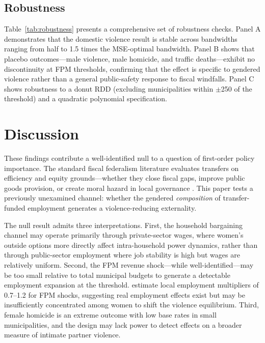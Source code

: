 \documentclass[12pt]{article}
\begin{document}
\subsection{Robustness}



Table~\ref{tab:robustness} presents a comprehensive set of robustness checks. Panel A demonstrates that the domestic violence result is stable across bandwidths ranging from half to 1.5 times the MSE-optimal bandwidth. Panel B shows that placebo outcomes---male violence, male homicide, and traffic deaths---exhibit no discontinuity at FPM thresholds, confirming that the effect is specific to gendered violence rather than a general public-safety response to fiscal windfalls. Panel C shows robustness to a donut RDD (excluding municipalities within $\pm$250 of the threshold) and a quadratic polynomial specification.

\section{Discussion}

These findings contribute a well-identified null to a question of first-order policy importance. The standard fiscal federalism literature evaluates transfers on efficiency and equity grounds---whether they close fiscal gaps, improve public goods provision, or create moral hazard in local governance \citep{brollo2013federal, gadenne2017tax}. This paper tests a previously unexamined channel: whether the gendered \textit{composition} of transfer-funded employment generates a violence-reducing externality.

The null result admits three interpretations. First, the household bargaining channel \citep{aizer2010wages} may operate primarily through private-sector wages, where women's outside options more directly affect intra-household power dynamics, rather than through public-sector employment where job stability is high but wages are relatively uniform. Second, the FPM revenue shock---while well-identified---may be too small relative to total municipal budgets to generate a detectable employment expansion at the threshold. \citet{corbi2019fiscal} estimate local employment multipliers of 0.7--1.2 for FPM shocks, suggesting real employment effects exist but may be insufficiently concentrated among women to shift the violence equilibrium. Third, female homicide is an extreme outcome with low base rates in small municipalities, and the design may lack power to detect effects on a broader measure of intimate partner violence.
\end{document}

